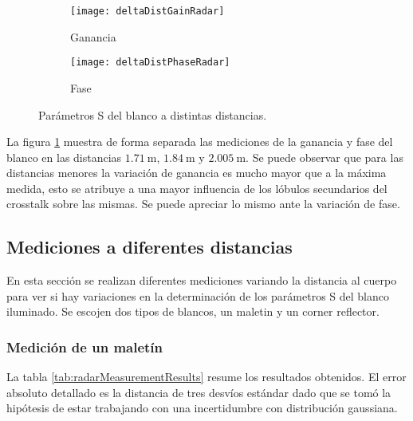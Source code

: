 \begin{figure}[H]
  \centering
  \begin{subfigure}{0.49\textwidth}
    \texttt{[image: deltaDistGainRadar]}
    \caption{Ganancia}
  \end{subfigure}
  \begin{subfigure}{0.49\textwidth}
    \texttt{[image: deltaDistPhaseRadar]}
    \caption{Fase}
  \end{subfigure}
  \caption{Parámetros S del blanco a distintas distancias.}
  \label{fig:deltaDistRadar}
\end{figure}
La figura \ref{fig:deltaDistRadar} muestra de forma separada las mediciones de la ganancia y fase del blanco en las distancias $\SI{1.71}{\meter}$, $\SI{1.84}{\meter}$ y $\SI{2.005}{\meter}$. Se puede observar que para las distancias menores la variación de ganancia es mucho mayor que a la máxima medida, esto se atribuye a una mayor influencia de los lóbulos secundarios del crosstalk sobre las mismas. Se puede apreciar lo mismo ante la variación de fase.


\subsection{Mediciones a diferentes distancias}

En esta sección se realizan diferentes mediciones variando la distancia al cuerpo para ver si hay variaciones en la determinación de los parámetros S del blanco iluminado. Se escojen dos tipos de blancos, un maletin y un corner reflector.

\subsubsection{Medición de un maletín}

La tabla \ref{tab:radarMeasurementResults} resume los resultados obtenidos. El error absoluto detallado es la distancia de tres desvíos estándar dado que se tomó la hipótesis de estar trabajando con una incertidumbre con distribución gaussiana.

